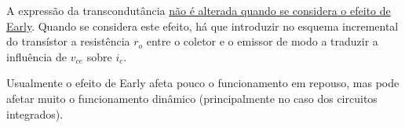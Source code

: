 {\setlength{\fboxrule}{2pt} 
\begin{minipage}{\linewidth}
    \hspace*{1pt}
    \noindent{}
\end{minipage}
}

\vspace{0.25em}
\noindent A expressão da transcondutância \underline{não é alterada quando se considera o efeito de Early}. Quando se considera este efeito, há que introduzir no esquema incremental do transístor a resistência $r_o$ entre o coletor e o emissor de modo a traduzir a influência de $v_\textit{ce}$ sobre $i_c$.

Usualmente o efeito de Early afeta pouco o funcionamento em repouso, mas pode afetar muito o funcionamento dinâmico (principalmente no caso dos circuitos integrados).

